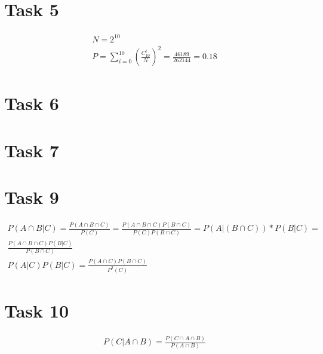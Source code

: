 \documentclass{article}
\begin{document}
	\section{Task 5}
	\begin{align*}
		N = 2^{10} \\
		P = \sum\limits_{i = 0}^{10}(\frac{C_{10}^{i}}{N})^2 = \frac{46189}{262144} = 0.18
	\end{align*}

    \section{Task 6}

    \section{Task 7}
    \section{Task 9}

    \begin{align*}
        P(A \cap B | C) = \frac{P(A \cap B \cap C)}{P(C)} = \frac{P(A \cap B \cap C) P(B \cap C)}{P(C)P(B \cap C)} = P(A|(B \cap C)) * P(B|C) = \\
        \frac{P(A \cap B \cap C) P(B|C)}{P(B \cap C)} \\
        P(A|C)P(B|C) = \frac{P(A \cap C)P(B \cap C)}{P^2(C)}       
    \end{align*}
    
    \section{Task 10}
    \begin{align*}
    	P(C|A \cap B) = \frac{P(C \cap A \cap B)}{P(A \cap B)}
    \end{align*}
\end{document}
